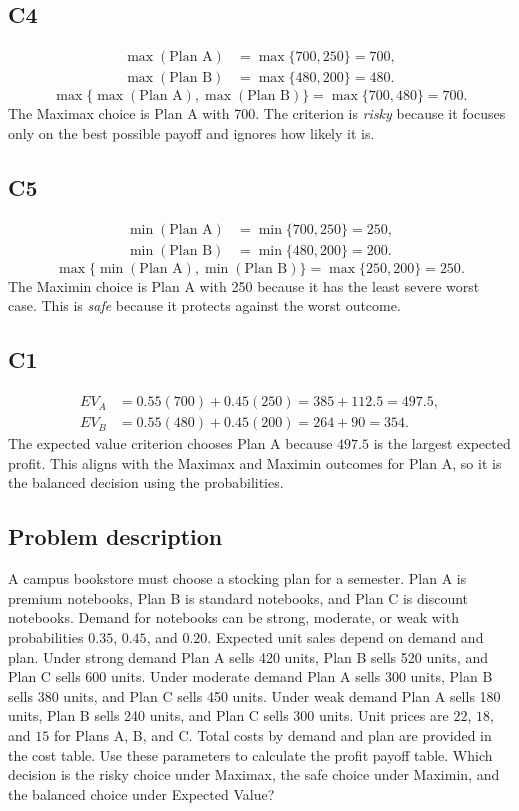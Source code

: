 \begin{ExamProblems}
		\subsection*{C4}
		\[
		\begin{aligned}
		\max(\text{Plan A}) &= \max\{700,250\} = 700,\\
		\max(\text{Plan B}) &= \max\{480,200\} = 480.
		\end{aligned}
		\]
		\[
		\max\{\max(\text{Plan A}), \max(\text{Plan B})\}
		= \max\{700, 480\}
		= 700.
		\]
		The Maximax choice is Plan A with 700. The criterion is \emph{risky} because it focuses only on the best possible payoff and ignores how likely it is.

		\subsection*{C5}
		\[
		\begin{aligned}
		\min(\text{Plan A}) &= \min\{700,250\} = 250,\\
		\min(\text{Plan B}) &= \min\{480,200\} = 200.
		\end{aligned}
		\]
		\[
		\max\{\min(\text{Plan A}), \min(\text{Plan B})\}
		= \max\{250, 200\}
		= 250.
		\]
		The Maximin choice is Plan A with 250 because it has the least severe worst case. This is \emph{safe} because it protects against the worst outcome.

		\subsection*{C1}
		\[
		\begin{aligned}
		EV_A &= 0.55(700)+0.45(250)=385+112.5=497.5,\\
		EV_B &= 0.55(480)+0.45(200)=264+90=354.
		\end{aligned}
		\]
		The expected value criterion chooses Plan A because $497.5$ is the largest expected profit. This aligns with the Maximax and Maximin outcomes for Plan A, so it is the balanced decision using the probabilities.

		\item
		\subsection*{Problem description}
		A campus bookstore must choose a stocking plan for a semester. Plan A is premium notebooks, Plan B is standard notebooks, and Plan C is discount notebooks. Demand for notebooks can be strong, moderate, or weak with probabilities $0.35$, $0.45$, and $0.20$. Expected unit sales depend on demand and plan. Under strong demand Plan A sells 420 units, Plan B sells 520 units, and Plan C sells 600 units. Under moderate demand Plan A sells 300 units, Plan B sells 380 units, and Plan C sells 450 units. Under weak demand Plan A sells 180 units, Plan B sells 240 units, and Plan C sells 300 units. Unit prices are $22$, $18$, and $15$ for Plans A, B, and C. Total costs by demand and plan are provided in the cost table. Use these parameters to calculate the profit payoff table. Which decision is the risky choice under Maximax, the safe choice under Maximin, and the balanced choice under Expected Value?


\end{ExamProblems}

